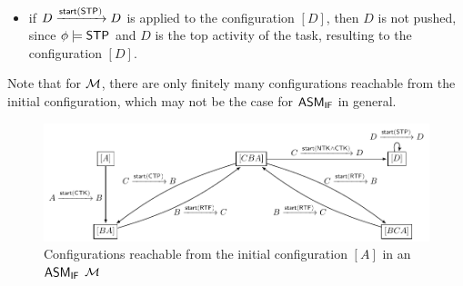 \begin{example}
\begin{itemize}
		\item if $D \xrightarrow{{\mathsf{start} }({\sf STP})} D$ is applied to the configuration $[D]$, then $D$ is not pushed, since $\phi\models{\sf STP}$ and $D$ is the top activity of the task, resulting to the configuration $[D]$.
	\end{itemize}
	Note that for ${\mathcal{M} }$, there are only finitely many configurations reachable from the initial configuration, which may not be the case for $\textsf{ASM}_\textsf{IF}$ in general.  
	
	
	
	\begin{figure}
		\centering
		\includegraphics[scale = 0.75]{ifasm-example.pdf}
		\caption{Configurations reachable from the initial configuration $[A]$ in an $\textsf{ASM}_\textsf{IF}$ ${\mathcal{M} }$}
		\label{ifasm-example}
	\end{figure}
\end{example}


